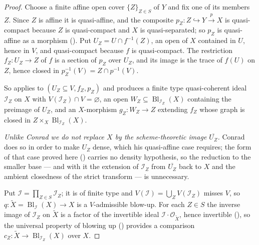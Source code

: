\begin{proof}
  \leanok
  Choose a finite affine open cover $\{Z\}_{Z\in S}$ of $Y$ and fix one of its
  members $Z$.  Since $Z$ is affine it is quasi-affine, and the composite
  $p_Z\colon Z\hookrightarrow Y\xrightarrow{p}X$ is quasi-compact because $Z$
  is quasi-compact and $X$ is quasi-separated; so $p_Z$ is quasi-affine as a
  morphism ().  Put
  $U_Z=U\cap f^{-1}(Z)$, an open of $X$ contained in $U$, hence in $V$, and
  quasi-compact because $f$ is quasi-compact.  The restriction
  $f_Z\colon U_Z\to Z$ of $f$ is a section of $p_Z$ over $U_Z$, and its image
  is the trace of $f(U)$ on $Z$, hence closed in $p_Z^{-1}(V)=Z\cap p^{-1}(V)$.

  So  applies to
  $(U_Z\subseteq V, f_Z, p_Z)$ and produces a finite type quasi-coherent ideal
  $\mathcal I_Z$ on $X$ with $V(\mathcal I_Z)\cap V=\varnothing$, an open
  $W_Z\subseteq\operatorname{Bl}_{\mathcal I_Z}(X)$ containing the preimage of
  $U_Z$, and an $X$-morphism $g_Z\colon W_Z\to Z$ extending $f_Z$ whose graph is
  closed in $Z\times_X\operatorname{Bl}_{\mathcal I_Z}(X)$.

  \emph{Unlike Conrad we do not replace $X$ by the scheme-theoretic image
  $\overline{U_Z}$.}  Conrad does so in order to make $U_Z$ dense, which his
  quasi-affine case requires; the form of that case proved here
  () carries no density
  hypothesis, so the reduction to the smaller base --- and with it the
  extension of $\mathcal I_Z$ from $\overline{U_Z}$ back to $X$ and the
  ambient closedness of the strict transform --- is unnecessary.

  Put $\mathcal I=\prod_{Z\in S}\mathcal I_Z$; it is of finite type and
  $V(\mathcal I)=\bigcup_ZV(\mathcal I_Z)$ misses $V$, so
  $q\colon\widetilde X=\operatorname{Bl}_{\mathcal I}(X)\to X$ is a
  $V$-admissible blow-up.  For each $Z\in S$ the inverse image of
  $\mathcal I_Z$ on $\widetilde X$ is a factor of the invertible ideal
  $\mathcal I\cdot\mathcal O_{\widetilde X}$, hence invertible
  (), so the universal property of
  blowing up () provides a
  comparison $c_Z\colon\widetilde X\to\operatorname{Bl}_{\mathcal I_Z}(X)$ over
  $X$.


\end{proof}
